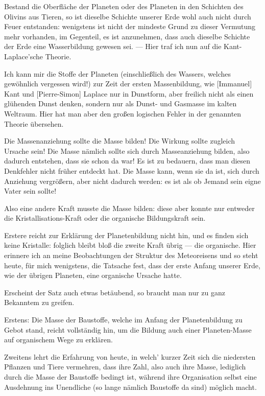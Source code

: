 \documentclass[a4paper, 12pt, oneside]{article}
\begin{document}
Bestand die Oberfläche der Planeten oder des Planeten in den Schichten des Olivins aus Tieren, so ist dieselbe Schichte unserer Erde wohl auch nicht durch Feuer entstanden: wenigstens ist nicht der mindeste Grund zu dieser Vermutung mehr vorhanden, im Gegenteil, es ist anzunehmen, dass auch dieselbe Schichte der Erde eine Wasserbildung gewesen sei. — Hier traf ich nun auf die Kant-Laplace'sche Theorie.

Ich kann mir die Stoffe der Planeten (einschließlich des Wassers, welches gewöhnlich vergessen wird!) zur Zeit der ersten Massenbildung, wie [Immanuel] Kant und [Pierre-Simon] Laplace nur in Dunstform, aber freilich nicht als einen glühenden Dunst denken, sondern nur als Dunst- und Gasmasse im kalten Weltraum. Hier hat man aber den großen logischen Fehler in der genannten Theorie übersehen.

Die Massenanziehung sollte die Masse bilden! Die Wirkung sollte zugleich Ursache sein! Die Masse nämlich sollte sich durch Masseanziehung bilden, also dadurch entstehen, dass sie schon da war! Es ist zu bedauern, dass man diesen Denkfehler nicht früher entdeckt hat. Die Masse kann, wenn sie da ist, sich durch Anziehung vergrößern, aber nicht dadurch werden: es ist als ob Jemand sein eigne Vater sein sollte!

Also eine andere Kraft musste die Masse bilden: diese aber konnte nur entweder die Kristallisations-Kraft oder die organische Bildungskraft sein.

Erstere reicht zur Erklärung der Planetenbildung nicht hin, und es finden sich keine Kristalle: folglich bleibt bloß die zweite Kraft übrig — die organische. Hier erinnere ich an meine Beobachtungen der Struktur des Meteoreisens und so steht heute, für mich wenigstens, die Tatsache fest, dass der erste Anfang unserer Erde, wie der übrigen Planeten, eine organische Ursache hatte.

Erscheint der Satz auch etwas betäubend, so braucht man nur zu ganz Bekanntem zu greifen.

Erstens: Die Masse der Baustoffe, welche im Anfang der Planetenbildung zu Gebot stand, reicht vollständig hin, um die Bildung auch einer Planeten-Masse auf organischem Wege zu erklären.

Zweitens lehrt die Erfahrung von heute, in welch' kurzer Zeit sich die niedersten Pflanzen und Tiere vermehren, dass ihre Zahl, also auch ihre Masse, lediglich durch die Masse der Baustoffe bedingt ist, während ihre Organisation selbst eine Ausdehnung ins Unendliche (so lange nämlich Baustoffe da sind) möglich macht.
\end{document}
